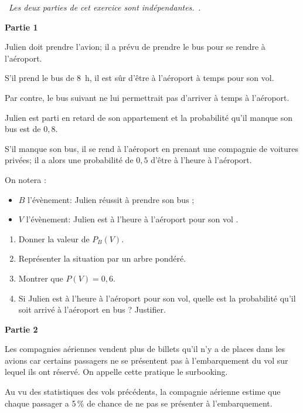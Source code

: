 \hfill~\emph{Les deux parties de cet exercice sont indépendantes.}\hfill~.

\medskip

\textbf{Partie 1}

\medskip

Julien doit prendre l'avion; il a prévu de prendre le bus pour se rendre à l'aéroport. 

S'il prend le bus de $8$~h, il est sûr d'être à l'aéroport à temps pour son vol.

Par contre, le bus suivant ne lui permettrait pas d'arriver à temps à l'aéroport.

Julien est parti en retard de son appartement et la probabilité qu'il manque son bus est de $0,8$.

S'il manque son bus, il se rend à l'aéroport en prenant une compagnie de voitures privées; il a alors une probabilité de $0,5$ d'être à l'heure à l'aéroport.

\smallskip

On notera :

\begin{itemize}
	\item $B$ l'évènement: \og Julien réussit à prendre son bus \fg ;
	\item $V$ l'évènement: \og Julien est à l'heure à l'aéroport pour son vol \fg.
\end{itemize}

\begin{enumerate}
	\item Donner la valeur de $P_B(V)$.
	\item Représenter la situation par un arbre pondéré.
	\item Montrer que $P(V) = 0,6$.
	\item Si Julien est à l'heure à l'aéroport pour son vol, quelle est la probabilité qu'il soit arrivé à l'aéroport en bus ? Justifier.
\end{enumerate}

\textbf{Partie 2}

\medskip

Les compagnies aériennes vendent plus de billets qu'il n'y a de places dans les avions car certains passagers ne se présentent pas à l'embarquement du vol sur lequel ils ont réservé.
On appelle cette pratique le surbooking.

Au vu des statistiques des vols précédents, la compagnie aérienne estime que chaque passager a 5\,\% de chance de ne pas se présenter à l'embarquement.

